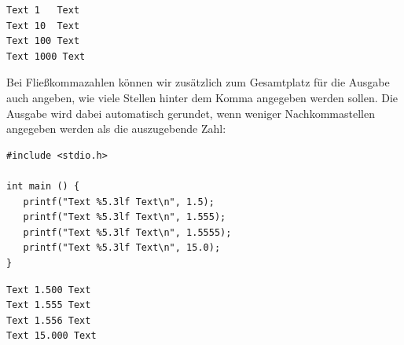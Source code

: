 \begin{cmdbox}
\begin{verbatim}
Text 1   Text
Text 10  Text
Text 100 Text
Text 1000 Text
\end{verbatim}
\end{cmdbox}

Bei Fließkommazahlen können wir zusätzlich zum Gesamtplatz für die Ausgabe auch angeben, wie viele Stellen hinter dem Komma angegeben werden sollen. Die Ausgabe wird dabei automatisch gerundet, wenn weniger Nachkommastellen angegeben werden als die auszugebende Zahl:

\begin{codebox}
\begin{verbatim}
#include <stdio.h>

int main () {
   printf("Text %5.3lf Text\n", 1.5);
   printf("Text %5.3lf Text\n", 1.555);
   printf("Text %5.3lf Text\n", 1.5555);
   printf("Text %5.3lf Text\n", 15.0);
}
\end{verbatim}
\end{codebox}

\begin{cmdbox}
\begin{verbatim}
Text 1.500 Text
Text 1.555 Text
Text 1.556 Text
Text 15.000 Text
\end{verbatim}
\end{cmdbox}
